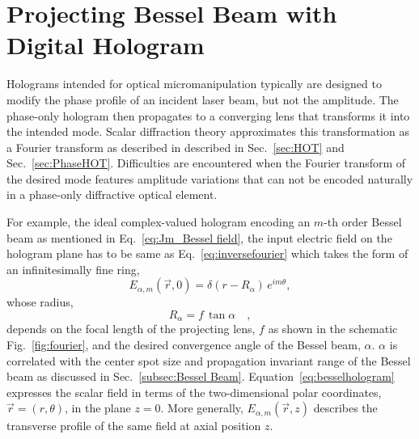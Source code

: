 \section{Projecting Bessel Beam with \\ Digital Hologram}
\label{sec:Project Bessel Hologram}

Holograms intended for optical micromanipulation typically are designed to modify the phase profile of an incident laser beam, but not the amplitude. The phase-only hologram then propagates to a converging lens that transforms it into the intended mode. Scalar diffraction theory approximates this transformation as a Fourier transform \cite{goodman05} as described in described in Sec.~\ref{sec:HOT} and Sec.~\ref{sec:PhaseHOT}. Difficulties are encountered when the Fourier transform of the desired mode features amplitude variations that can not be encoded naturally in a phase-only diffractive optical element.

For example, the ideal complex-valued hologram encoding 
an $m$-th order Bessel beam as mentioned in Eq.~\eqref{eq:Jm_Bessel field}, the input electric field on the hologram plane has to be same as Eq.~\eqref{eq:inversefourier} which takes the form of an infinitesimally fine ring,
\begin{equation}
  \label{eq:besselhologram}
  E_{\alpha,m}(\vec{r},0)
  =
  \delta(r - R_\alpha) \, e^{i m\theta},
\end{equation}
whose radius, 
\begin{equation}
\label{eq:Ralpha}
R_{\alpha} = f \, \tan \alpha \quad ,
\end{equation}
depends on the focal length of the projecting lens, $f$ as shown in the schematic Fig.~\ref{fig:fourier}, and the desired convergence angle of the Bessel beam, $\alpha$. $\alpha$ is correlated with the center spot size and propagation invariant range of the Bessel beam as discussed in Sec.~\ref{subsec:Bessel Beam}.
Equation~\eqref{eq:besselhologram} expresses the
scalar field in terms of the two-dimensional
polar coordinates, $\vec{r} = (r,\theta)$, in the plane $z = 0$.
More generally, $E_{\alpha,m}(\vec{r},z)$ describes the
transverse profile of the same field at axial position $z$.

